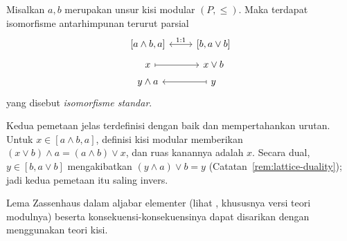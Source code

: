 \begin{proposisi}\label{prop:lattice-diamond-isom}
	Misalkan $a,b$ merupakan unsur kisi modular $(P,\leq)$. Maka terdapat
	isomorfisme antarhimpunan terurut parsial
	\[\begin{tikzcd}[row sep=tiny]
		{[a \wedge b, a]} \arrow[leftrightarrow, r, "1:1"] & {[b, a \vee b]} \\
		x \arrow[mapsto, r] & x \vee b \\
		y \wedge a & y \arrow[mapsto, l]
	\end{tikzcd}\]
	yang disebut \emph{isomorfisme standar}.
\end{proposisi}
\begin{bukti}
	Kedua pemetaan jelas terdefinisi dengan baik dan mempertahankan urutan.
	Untuk $x \in [a \wedge b,a]$, definisi kisi modular memberikan
	$(x \vee b) \wedge a=(a \wedge b) \vee x$, dan ruas kanannya adalah $x$.
	Secara dual, $y \in [b,a \vee b]$ mengakibatkan
	$(y \wedge a) \vee b=y$ (Catatan~\ref{rem:lattice-duality}); jadi kedua
	pemetaan itu saling invers.
\end{bukti}

Lema Zassenhaus dalam aljabar elementer (lihat \cite[Lema 4.6.4]{Li1},
khususnya versi teori modulnya) beserta konsekuensi-konsekuensinya dapat
disarikan dengan menggunakan teori kisi.

